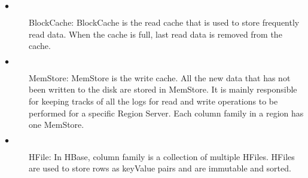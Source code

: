 \documentclass[11pt,a4paper,bibtotoc,idxtotoc,headsepline,footsepline,footexclude,BCOR12mm,DIV13]{scrbook}
\begin{document}
\begin{description}
	\item[$\bullet$]  BlockCache: BlockCache is the read cache that is used to store frequently read data\cite{hbase:insights}. When the cache is full, last read data is removed from the cache.
\end{description}

\begin{description}
	\item[$\bullet$] MemStore: MemStore is the write cache. All the new data that has not been written to the disk are stored in MemStore. It is mainly responsible for keeping tracks of all the logs for read and write operations to be performed for a specific Region Server\cite{hbase:architecture}. Each column family in a region has one MemStore\cite{hbase:insights}.
\end{description}

\begin{description}
	\item[$\bullet$] HFile: In HBase, column family is a collection of multiple HFiles. HFiles are used to store rows as keyValue pairs and are immutable and sorted\cite{hbase:insights}.
\end{description}
\end{document}
